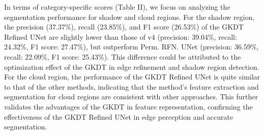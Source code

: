 \documentclass[journal]{IEEEtran}
\begin{document}
In terms of category-specific scores (Table II), we focus on analyzing the segmentation performance for shadow and cloud regions. For the shadow region, the precision (37.37\%), recall (23.85\%), and F1 score (26.53\%) of the GKDT Refined UNet are slightly lower than those of v4 (precision: 39.04\%, recall: 24.32\%, F1 score: 27.47\%), but outperform Perm. RFN. UNet (precision: 36.59\%, recall: 22.09\%, F1 score: 25.43\%). This difference could be attributed to the optimization effect of the GKDT in edge refinement and shadow region detection. For the cloud region, the performance of the GKDT Refined UNet is quite similar to that of the other methods, indicating that the method's feature extraction and segmentation for cloud regions are consistent with other approaches. This further validates the advantages of the GKDT in feature representation, confirming the effectiveness of the GKDT Refined UNet in edge perception and accurate segmentation.
\end{document}
